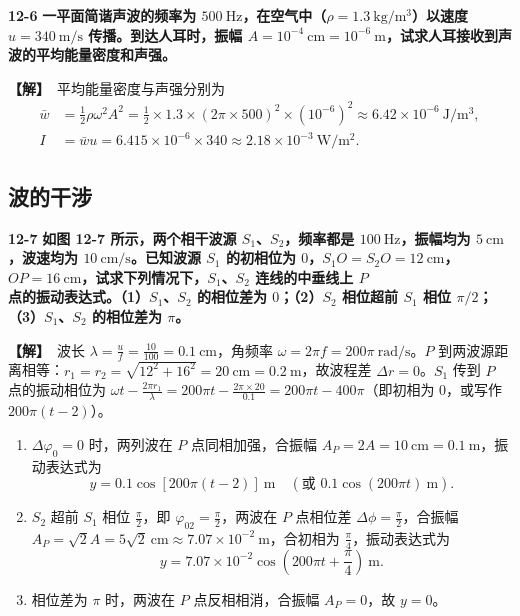 \documentclass[zihao=5,a4paper,UTF8]{ctexart}
\newenvironment{prob}[2]{%
    \par\vspace{6pt}\noindent\textbf{\color{navy}#1} \textbf{#2}\par\nopagebreak\vspace{2pt}%
}{%
    \par\vspace{4pt}%
}
\newcommand{\sol}{\noindent\textbf{\color{tealaccent}【解】}\ }
\begin{document}
\begin{prob}{12-6}{一平面简谐声波的频率为 $500\ \mathrm{Hz}$，在空气中（$\rho = 1.3\ \mathrm{kg/m^3}$）以速度 $u=340\ \mathrm{m/s}$ 传播。到达人耳时，振幅 $A=10^{-4}\ \mathrm{cm} = 10^{-6}\ \mathrm{m}$，试求人耳接收到声波的平均能量密度和声强。}
\sol 平均能量密度与声强分别为
\begin{align*}
    \bar{w} &= \frac{1}{2}\rho\omega^2 A^2 = \frac{1}{2}\times 1.3\times (2\pi\times 500)^2\times (10^{-6})^2 \approx 6.42\times 10^{-6}\ \mathrm{J/m^3},\\
    I &= \bar{w}u = 6.415\times 10^{-6}\times 340 \approx 2.18\times 10^{-3}\ \mathrm{W/m^2}.
\end{align*}
\end{prob}

\subsection{波的干涉}

\begin{prob}{12-7}{如图 12-7 所示，两个相干波源 $S_1$、$S_2$，频率都是 $100\ \mathrm{Hz}$，振幅均为 $5\ \mathrm{cm}$，波速均为 $10\ \mathrm{cm/s}$。已知波源 $S_1$ 的初相位为 $0$，$S_1O=S_2O=12\ \mathrm{cm}$，$OP=16\ \mathrm{cm}$，试求下列情况下，$S_1$、$S_2$ 连线的中垂线上 $P$ 点的振动表达式。（1）$S_1$、$S_2$ 的相位差为 $0$；（2）$S_2$ 相位超前 $S_1$ 相位 $\pi/2$；（3）$S_1$、$S_2$ 的相位差为 $\pi$。}
\sol 波长 $\lambda = \frac{u}{f} = \frac{10}{100} = 0.1\ \mathrm{cm}$，角频率 $\omega = 2\pi f = 200\pi\ \mathrm{rad/s}$。$P$ 到两波源距离相等：$r_1 = r_2 = \sqrt{12^2 + 16^2} = 20\ \mathrm{cm} = 0.2\ \mathrm{m}$，故波程差 $\Delta r = 0$。$S_1$ 传到 $P$ 点的振动相位为 $\omega t - \frac{2\pi r_1}{\lambda} = 200\pi t - \frac{2\pi\times 20}{0.1} = 200\pi t - 400\pi$（即初相为 $0$，或写作 $200\pi(t-2)$）。
\begin{enumerate}[leftmargin=2em, itemsep=2pt]
    \item $\Delta\varphi_0 = 0$ 时，两列波在 $P$ 点同相加强，合振幅 $A_P = 2A = 10\ \mathrm{cm} = 0.1\ \mathrm{m}$，振动表达式为
    \[
        y = 0.1\cos[200\pi(t-2)]\ \mathrm{m}\quad (\text{或 } 0.1\cos(200\pi t)\ \mathrm{m}).
    \]
    \item $S_2$ 超前 $S_1$ 相位 $\frac{\pi}{2}$，即 $\varphi_{02} = \frac{\pi}{2}$，两波在 $P$ 点相位差 $\Delta\phi = \frac{\pi}{2}$，合振幅 $A_P = \sqrt{2}A = 5\sqrt{2}\ \mathrm{cm} \approx 7.07\times 10^{-2}\ \mathrm{m}$，合初相为 $\frac{\pi}{4}$，振动表达式为
    \[
        y = 7.07\times 10^{-2}\cos\left(200\pi t + \frac{\pi}{4}\right)\ \mathrm{m}.
    \]
    \item 相位差为 $\pi$ 时，两波在 $P$ 点反相相消，合振幅 $A_P = 0$，故 $y = 0$。
\end{enumerate}
\end{prob}
\end{document}
